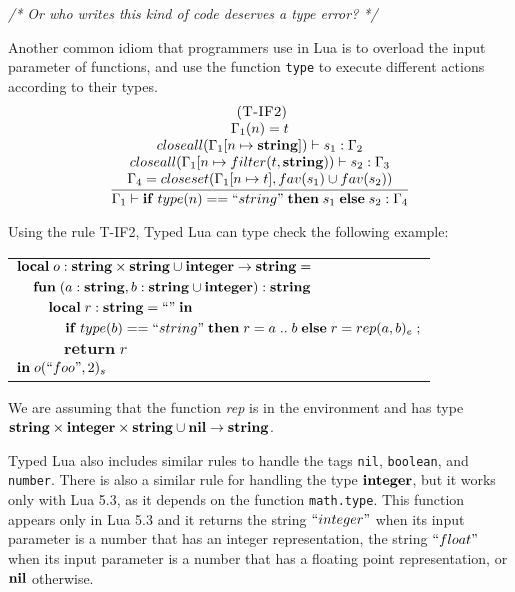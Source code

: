 \textit{/* Or who writes this kind of code deserves a type error? */}

Another common idiom that programmers use in Lua is to overload
the input parameter of functions, and use the function \texttt{type}
to execute different actions according to their types.
\[
\begin{array}{c}
\; (\textsc{T-IF2})\\
\dfrac{\begin{array}{c}
       \Gamma_{1}(n) = t\\
       closeall(\Gamma_{1}[n \mapsto \mathbf{string}]) \vdash s_{1}:\Gamma_{2} \\
       closeall(\Gamma_{1}[n \mapsto filter(t, \mathbf{string})) \vdash s_{2}:\Gamma_{3}\\
       \Gamma_{4} = closeset(\Gamma_{1}[n \mapsto t], fav(s_{1}) \cup fav(s_{2}))
      \end{array}}
      {\Gamma_{1} \vdash \mathbf{if} \; type(n) == ``string" \; \mathbf{then} \; s_{1} \; \mathbf{else} \; s_{2}:\Gamma_{4}}

\end{array}
\]

Using the rule \textsc{T-IF2}, Typed Lua can type check the following example:
\begin{center}
\begin{tabular}{llll}
\multicolumn{4}{l}{$\mathbf{local} \; o:\mathbf{string} \times \mathbf{string} \cup \mathbf{integer} \rightarrow \mathbf{string} =$}\\
& \multicolumn{3}{l}{$\mathbf{fun} \; (a:\mathbf{string}, b:\mathbf{string} \cup \mathbf{integer}):\mathbf{string}$}\\
& & \multicolumn{2}{l}{$\mathbf{local} \; r:\mathbf{string} = ``" \; \mathbf{in}$}\\
& & & \multicolumn{1}{l}{$\mathbf{if} \; type(b) == ``string" \; \mathbf{then} \; r = a \;{..}\;b \; \mathbf{else} \; r = rep(a, b)_{e}\; ;$}\\
& & & \multicolumn{1}{l}{$\mathbf{return} \; r$}\\
\multicolumn{4}{l}{$\mathbf{in} \; o(``foo", 2)_{s}$}
\end{tabular}
\end{center}

We are assuming that the function \emph{rep} is in the environment and has type
$\mathbf{string} \times \mathbf{integer} \times \mathbf{string} \cup \mathbf{nil} \rightarrow \mathbf{string}$.

Typed Lua also includes similar rules to handle the tags \texttt{nil},
\texttt{boolean}, and \texttt{number}.
There is also a similar rule for handling the type $\mathbf{integer}$, but
it works only with Lua 5.3, as it depends on the function \texttt{math.type}.
This function appears only in Lua 5.3 and it returns the string $``integer"$
when its input parameter is a number that has an integer representation,
the string $``float"$ when its input parameter is a number that has a
floating point representation, or $\mathbf{nil}$ otherwise.

